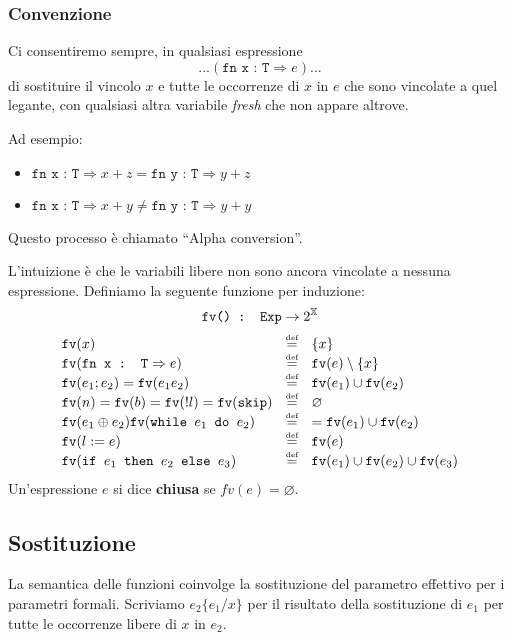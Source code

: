 \subsubsection{Convenzione}
Ci consentiremo sempre, in qualsiasi espressione 
\[...(\texttt{fn x : T}\Rightarrow e)...\]
di sostituire il vincolo $x$ e tutte le occorrenze di $x$ in $e$
che sono vincolate a quel legante, con qualsiasi altra variabile
\textit{fresh} che non appare altrove. 

Ad esempio:
\begin{itemize}
    \item $\texttt{fn x : T}\Rightarrow x+z=\texttt{fn y : T}\Rightarrow y+z$
    \item $\texttt{fn x : T}\Rightarrow x+y \not= \texttt{fn y : T}\Rightarrow y+y$
\end{itemize}

Questo processo è chiamato ``Alpha conversion''.

L'intuizione è che le variabili libere non sono ancora vincolate a
nessuna espressione. Definiamo la seguente funzione per induzione:
\[
    \texttt{fv() : Exp}\rightarrow 2^\mathbb{X} \\  
\]
\[
\begin{array}{lcl}
    \texttt{fv}(x) & \defeq & \{x\} \\
    \texttt{fv}(\texttt{fn x : T}\Rightarrow e) & \defeq &  \texttt{fv}(e) \setminus \{x\} \\
    \texttt{fv}(e_1;e_2) = \texttt{fv}(e_1e_2) & \defeq &  \texttt{fv}(e_1) \cup \texttt{fv}(e_2) \\
    \texttt{fv}(n) = \texttt{fv}(b) = \texttt{fv}(!l) = \texttt{fv}(\texttt{skip}) &
    \defeq & \varnothing \\
    \texttt{fv}(e_1 \oplus e_2) \texttt{fv}(\texttt{while } e_1 \texttt{ do } e_2) & 
    \defeq & = \texttt{fv}(e_1) \cup \texttt{fv}(e_2) \\
    \texttt{fv}(l := e) & \defeq & \texttt{fv}(e) \\
    \texttt{fv}(\texttt{if } e_1 \texttt{ then } e_2 \texttt{ else } e_3)
    & \defeq & \texttt{fv}(e_1) \cup \texttt{fv}(e_2) \cup \texttt{fv}(e_3)
\end{array}
\]
Un'espressione $e$ si dice \textbf{chiusa} se $fv(e) = \varnothing$.
\subsection{Sostituzione}
La semantica delle funzioni coinvolge la sostituzione del parametro effettivo per
i parametri formali. Scriviamo $e_2\{e_1/x\}$ per il risultato della sostituzione
di $e_1$ per tutte le occorrenze libere di $x$ in $e_2$.

